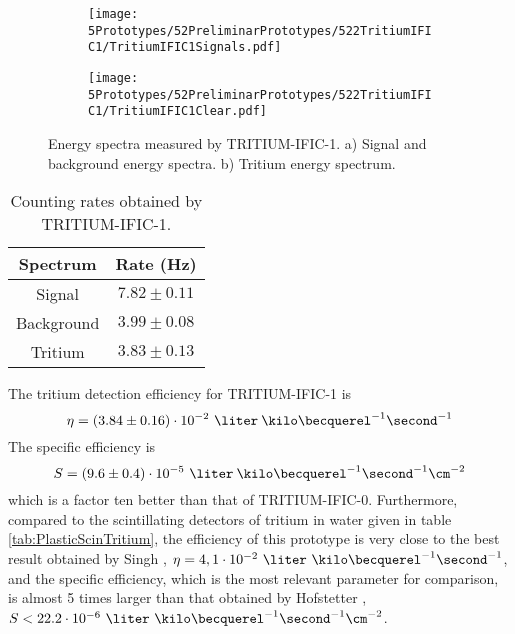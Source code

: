 \begin{figure}
\centering
    \begin{subfigure}[b]{1\textwidth}
    \centering
    \texttt{[image: 5Prototypes/52PreliminarPrototypes/522TritiumIFIC1/TritiumIFIC1Signals.pdf]}  
    \caption{\label{subfig:SignalBackgroundEnergySpectraTritiumIFIC1}}
    \end{subfigure}
    \hfill
    \begin{subfigure}[b]{1\textwidth}
    \centering
    \texttt{[image: 5Prototypes/52PreliminarPrototypes/522TritiumIFIC1/TritiumIFIC1Clear.pdf]}  
    \caption{\label{subfig:TritiumEnergySpectraTritiumIFIC1}}
    \end{subfigure}
 \caption{Energy spectra measured by TRITIUM-IFIC-1. a) Signal and background energy spectra. b) Tritium energy spectrum.}
 \label{fig:EnergySpectraTRITIUMIFIC1}
\end{figure}

\begin{table}[htbp]
\centering{}%
\begin{tabular}{cc}
\toprule 
Spectrum & Rate (Hz) \tabularnewline
\midrule
\midrule 
Signal & $7.82 \pm 0.11$ \tabularnewline
Background & $3.99 \pm 0.08$ \tabularnewline  
Tritium & $3.83 \pm 0.13$ \tabularnewline
\bottomrule
\end{tabular}
\caption{Counting rates obtained by TRITIUM-IFIC-1.}
\label{tab:CountsPerSecondTRITIUMIFIC1}
\end{table}
The tritium detection efficiency for TRITIUM-IFIC-1 is 
$$\eta=(3.84 \pm 0.16)\cdot{} 10^{-2}~\liter\:\kilo\becquerel^{-1}\second^{-1}$$
The specific efficiency is
$$S=(9.6 \pm 0.4)\cdot{} 10^{-5}~\liter\:\kilo\becquerel^{-1}\second^{-1}\cm^{-2}$$
which is a factor ten better than that of TRITIUM-IFIC-0. Furthermore, compared to the scintillating detectors of tritium in water given in table \ref{tab:PlasticScinTritium}, the efficiency of this prototype is very close to the best result obtained by Singh \cite{Ratnakaran, Ratnakaran2000}, $\eta=4,1 \cdot{} 10^{-2}~\liter\ \kilo\becquerel^{-1}\second^{-1}$, and the specific efficiency, which is the most relevant parameter for comparison, is almost 5 times larger than that obtained by Hofstetter \cite{Hofstetter1, Hofstetter2}, $S<22.2 \cdot{} 10^{-6}~\liter\ \kilo\becquerel^{-1}\second^{-1}\cm^{-2}$.
